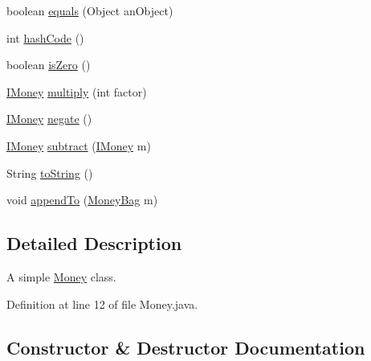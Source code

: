\begin{DoxyCompactItemize}
\item 
boolean \mbox{\hyperlink{classes_1_1deusto_1_1testing_1_1junit_1_1_money_a2356df38b8e9ecdd969bab11d6dd301b}{equals}} (Object an\+Object)
\item 
int \mbox{\hyperlink{classes_1_1deusto_1_1testing_1_1junit_1_1_money_af6cfb5b27bf97170d990dea12de04f37}{hash\+Code}} ()
\item 
boolean \mbox{\hyperlink{classes_1_1deusto_1_1testing_1_1junit_1_1_money_a797658a03260b535e9a36ebbcc3b19c9}{is\+Zero}} ()
\item 
\mbox{\hyperlink{interfacees_1_1deusto_1_1testing_1_1junit_1_1_i_money}{I\+Money}} \mbox{\hyperlink{classes_1_1deusto_1_1testing_1_1junit_1_1_money_a02c7d4e9013710f70d1d46e9c9ebae88}{multiply}} (int factor)
\item 
\mbox{\hyperlink{interfacees_1_1deusto_1_1testing_1_1junit_1_1_i_money}{I\+Money}} \mbox{\hyperlink{classes_1_1deusto_1_1testing_1_1junit_1_1_money_ae5f0bc3ea87f1fd55d6478653b8f2e36}{negate}} ()
\item 
\mbox{\hyperlink{interfacees_1_1deusto_1_1testing_1_1junit_1_1_i_money}{I\+Money}} \mbox{\hyperlink{classes_1_1deusto_1_1testing_1_1junit_1_1_money_aada973cd1a31410ed2b7e5d2ae6bc2e9}{subtract}} (\mbox{\hyperlink{interfacees_1_1deusto_1_1testing_1_1junit_1_1_i_money}{I\+Money}} m)
\item 
String \mbox{\hyperlink{classes_1_1deusto_1_1testing_1_1junit_1_1_money_af9e655069123757bea0efecc4efcd638}{to\+String}} ()
\item 
void \mbox{\hyperlink{classes_1_1deusto_1_1testing_1_1junit_1_1_money_aa9a6df9f35118060914ae6e8f74d1d51}{append\+To}} (\mbox{\hyperlink{classes_1_1deusto_1_1testing_1_1junit_1_1_money_bag}{Money\+Bag}} m)
\end{DoxyCompactItemize}


\subsection{Detailed Description}
A simple \mbox{\hyperlink{classes_1_1deusto_1_1testing_1_1junit_1_1_money}{Money}} class. 

Definition at line 12 of file Money.\+java.



\subsection{Constructor \& Destructor Documentation}
\mbox{\label{classes_1_1deusto_1_1testing_1_1junit_1_1_money_a6f1749eb364c59ed038f79cf8965e3bc}} 
